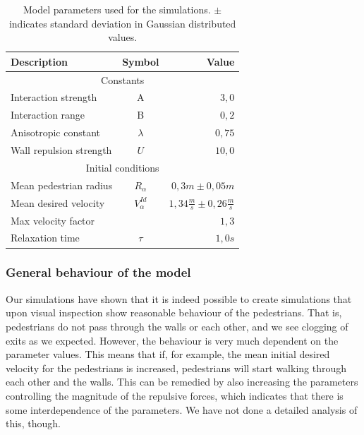 \begin{table}[ht]
    \begin{center}
        \begin{tabular}{l c r}
            \toprule
            \textbf{Description} & \textbf{Symbol} & \textbf{Value} \\
            \midrule
            \multicolumn{3}{c}{\textsf{Constants}}\\
            Interaction strength & A & $3,0$ \\
            Interaction range & B & $0,2$ \\
            Anisotropic constant & $\lambda$ & $0,75$ \\
            Wall repulsion strength & $U$ &  $10,0$ \\
            \midrule
            \multicolumn{3}{c}{\textsf{Initial conditions}}\\
            Mean pedestrian radius & $R_\alpha$ & $0,3 m \pm 0,05 m$\\
            Mean desired velocity &  $V^{Id}_\alpha$ &  $1,34\frac{m}{s} \pm 0,26
            \frac{m}{s}$ \\
            Max velocity factor &  &  $1,3$ \\
            Relaxation time & $\tau$ & $1,0 s$\\
            \bottomrule
        \end{tabular}
        \caption[Model parameters]{Model parameters used for the simulations.  
        $\pm$ indicates standard deviation in Gaussian distributed values.}
        \label{tbl:parameter-settings}
    \end{center}
\end{table}

\subsubsection{General behaviour of the model}
Our simulations have shown that it is indeed possible to create simulations 
that upon visual inspection show reasonable behaviour of the pedestrians. That 
is, pedestrians do not pass through the walls or each other, and we see clogging 
of exits as we expected. However, the behaviour is very much dependent on the 
parameter values. This means that if, for example, the mean initial desired 
velocity for the pedestrians is increased, pedestrians will start walking 
through each other and the walls. This can be remedied by also increasing 
the parameters controlling the magnitude of the repulsive forces, which 
indicates that there is some interdependence of the parameters. We have 
not done a detailed analysis of this, though.

